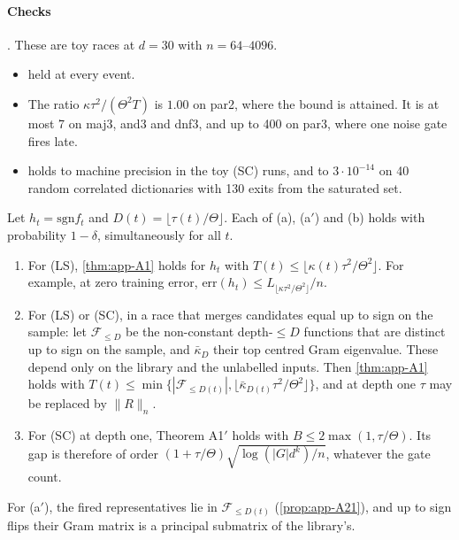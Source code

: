 \paragraph{Checks} . These are toy races at $d=30$ with $n=64$--$4096$.
\begin{itemize}[nosep]
\item {} held at every event.
\item The ratio $\kappa\tau^2/(\Theta^2T)$ is $1.00$ on par2, where the bound is attained. It is at most 7 on maj3, and3 and dnf3, and up to 400 on par3, where one noise gate fires late.
\item {} holds to machine precision in the toy (SC) runs, and to $3\cdot10^{-14}$ on 40 random correlated dictionaries with 130 exits from the saturated set.
\end{itemize}

\begin{corollary}\label{cor:app-A25}
\quad Let $h_t=\mathrm{sgn}f_t$ and $D(t)=\lfloor\tau(t)/\Theta\rfloor$. Each of (a), (a$'$) and (b) holds with probability $1-\delta$, simultaneously for all $t$.
\begin{enumerate}[label=(\alph*),nosep]
\item For (LS), \cref{thm:app-A1} holds for $h_t$ with $T(t)\le\lfloor\kappa(t)\tau^2/\Theta^2\rfloor$. For example, at zero training error, $\mathrm{err}(h_t)\le L_{\lfloor\kappa\tau^2/\Theta^2\rfloor}/n$.
\item[(a$'$)] For (LS) or (SC), in a race that merges candidates equal up to sign on the sample: let $\mathcal F_{\le D}$ be the non-constant depth-$\le D$ functions that are distinct up to sign on the sample, and $\bar\kappa_D$ their top centred Gram eigenvalue. These depend only on the library and the unlabelled inputs. Then \cref{thm:app-A1} holds with $T(t)\le\min\{|\mathcal F_{\le D(t)}|,\lfloor\bar\kappa_{D(t)}\tau^2/\Theta^2\rfloor\}$, and at depth one $\tau$ may be replaced by $\|R\|_n$.
\item[(b)] For (SC) at depth one, Theorem A1$'$ holds with $B\le2\max(1,\tau/\Theta)$. Its gap is therefore of order $(1+\tau/\Theta)\sqrt{\log(|G|d^k)/n}$, whatever the gate count.
\end{enumerate}
\end{corollary}
For (a$'$), the fired representatives lie in $\mathcal F_{\le D(t)}$ (\cref{prop:app-A21}), and up to sign flips their Gram matrix is a principal submatrix of the library's.

